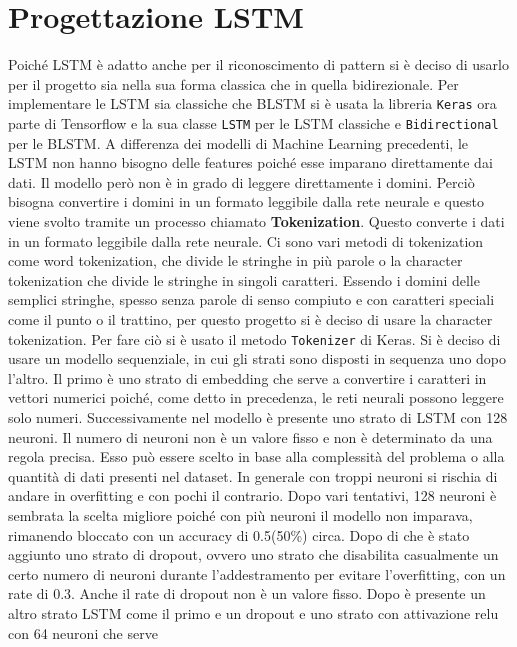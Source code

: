 \documentclass[12pt,a4paper,openright,twoside]{book}
\begin{document}
\section{Progettazione LSTM}
Poiché LSTM è adatto anche per il riconoscimento di pattern
si è deciso di usarlo per il progetto sia nella sua forma classica che in quella bidirezionale.
Per implementare le LSTM sia classiche che BLSTM si è usata la libreria \texttt{Keras}
ora parte di Tensorflow
e la sua classe \texttt{LSTM} per le LSTM classiche e \texttt{Bidirectional} per le BLSTM.
A differenza dei modelli di Machine Learning precedenti,
le LSTM non hanno bisogno delle features poiché esse imparano direttamente dai dati.
Il modello però non è in grado di leggere direttamente i domini.
Perciò bisogna convertire i domini in un formato leggibile dalla rete neurale e questo viene
svolto tramite un processo chiamato \textbf{Tokenization}.
Questo converte i dati in un formato leggibile dalla rete neurale.
Ci sono vari metodi di tokenization come word tokenization, che divide 
le stringhe in più parole o la character tokenization
che divide le stringhe in singoli caratteri. Essendo i domini delle semplici stringhe,
spesso senza parole di senso compiuto e con caratteri speciali come il punto o il trattino,
per questo progetto si è deciso di usare la character tokenization.
Per fare ciò si è usato il metodo \texttt{Tokenizer} di Keras.
Si è deciso di usare
un modello sequenziale, in cui gli
strati sono disposti in sequenza uno dopo l'altro. \hfil \break
Il primo è uno strato di embedding che serve 
a convertire i caratteri in vettori numerici poiché,
come detto in precedenza, le reti neurali
possono leggere solo numeri. \hfil \break
Successivamente nel modello è presente uno strato di LSTM
con 128 neuroni. Il numero di neuroni non 
è un valore fisso e non è determinato da una regola precisa.
Esso può essere scelto in base
alla complessità del problema o alla quantità di dati
presenti nel dataset. In generale con troppi neuroni si rischia di
andare in overfitting e con pochi il contrario. Dopo
vari tentativi, 128 neuroni è sembrata la scelta migliore poiché
con più neuroni il modello non imparava, rimanendo bloccato con un accuracy di 0.5(50\%) circa. \hfil \break
Dopo di che è stato aggiunto uno strato di dropout,
ovvero uno strato che disabilita casualmente
un certo numero di neuroni durante l'addestramento 
per evitare l'overfitting, con un rate di 0.3. Anche il rate di dropout non
è un valore fisso.
Dopo è presente un altro strato LSTM come il primo e un dropout
e uno strato con attivazione relu con 64 neuroni che serve
\end{document}
